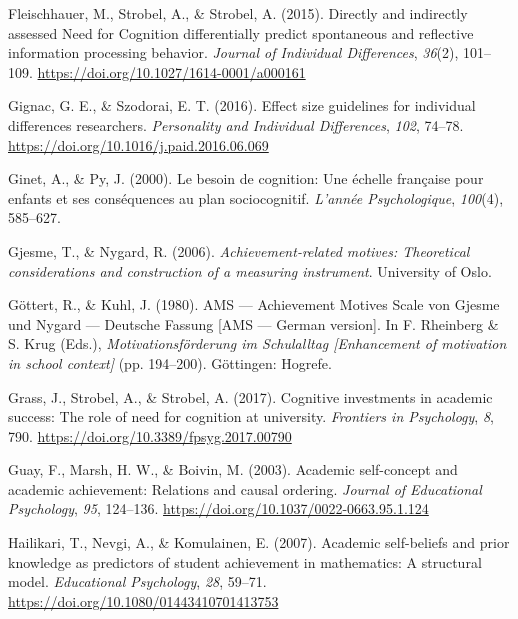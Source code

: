 \documentclass[
  man]{apa6}
\newlength{\cslhangindent}
\newlength{\cslentryspacingunit} %
\newenvironment{CSLReferences}[2] %
 {%
  \setlength{\parindent}{0pt}
  \ifodd #1
  \let\oldpar\par
  \def\par{\hangindent=\cslhangindent\oldpar}
  \fi
  \setlength{\parskip}{#2\cslentryspacingunit}
 }%
 {}
\begin{document}
\begin{CSLReferences}{1}{0}
\leavevmode{}%
Fleischhauer, M., Strobel, A., \& Strobel, A. (2015). Directly and indirectly assessed {N}eed for {C}ognition differentially predict spontaneous and reflective information processing behavior. \emph{Journal of Individual Differences}, \emph{36}(2), 101--109. \url{https://doi.org/10.1027/1614-0001/a000161}

\leavevmode{}%
Gignac, G. E., \& Szodorai, E. T. (2016). Effect size guidelines for individual differences researchers. \emph{Personality and Individual Differences}, \emph{102}, 74--78. \url{https://doi.org/10.1016/j.paid.2016.06.069}

\leavevmode{}%
Ginet, A., \& Py, J. (2000). Le besoin de cognition: Une {é}chelle fran{ç}aise pour enfants et ses cons{é}quences au plan sociocognitif. \emph{L'ann{é}e Psychologique}, \emph{100}(4), 585--627.

\leavevmode{}%
Gjesme, T., \& Nygard, R. (2006). \emph{Achievement-related motives: Theoretical considerations and construction of a measuring instrument}. University of Oslo.

\leavevmode{}%
Göttert, R., \& Kuhl, J. (1980). AMS --- {A}chievement {M}otives {S}cale von {G}jesme und {N}ygard --- {D}eutsche {F}assung {[}{AMS} --- {G}erman version{]}. In F. Rheinberg \& S. Krug (Eds.), \emph{Motivationsf{ö}rderung im {S}chulalltag {[}{E}nhancement of motivation in school context{]}} (pp. 194--200). G{ö}ttingen: Hogrefe.

\leavevmode{}%
Grass, J., Strobel, A., \& Strobel, A. (2017). Cognitive investments in academic success: The role of need for cognition at university. \emph{Frontiers in Psychology}, \emph{8}, 790. \url{https://doi.org/10.3389/fpsyg.2017.00790}

\leavevmode{}%
Guay, F., Marsh, H. W., \& Boivin, M. (2003). Academic self-concept and academic achievement: Relations and causal ordering. \emph{Journal of Educational Psychology}, \emph{95}, 124--136. \url{https://doi.org/10.1037/0022-0663.95.1.124}

\leavevmode{}%
Hailikari, T., Nevgi, A., \& Komulainen, E. (2007). Academic self-beliefs and prior knowledge as predictors of student achievement in mathematics: A structural model. \emph{Educational Psychology}, \emph{28}, 59--71. \url{https://doi.org/10.1080/01443410701413753}


\end{CSLReferences}
\end{document}
